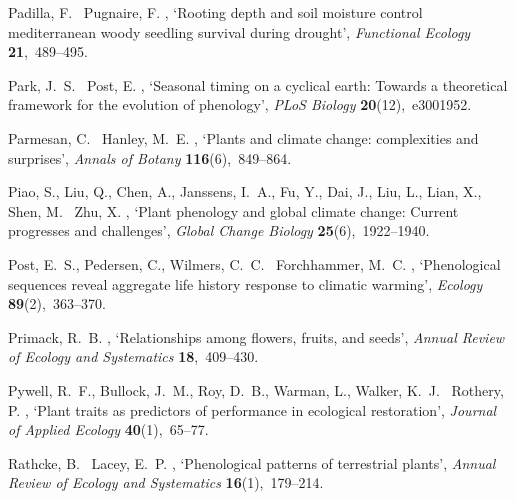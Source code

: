 \documentclass[11pt]{article}
\begin{document}
\begin{thebibliography}{xx}
Padilla, F. \harvardand\ Pugnaire, F.  \harvardyearright ,
  `Rooting depth and soil moisture control mediterranean woody seedling
  survival during drought', {\em Functional Ecology} {\bf 21},~489--495.

Park, J.~S. \harvardand\ Post, E.  \harvardyearright ,
  `Seasonal timing on a cyclical earth: Towards a theoretical framework for the
  evolution of phenology', {\em PLoS Biology} {\bf 20}(12),~e3001952.

Parmesan, C. \harvardand\ Hanley, M.~E.  \harvardyearright
  , `Plants and climate change: complexities and surprises', {\em Annals of
  Botany} {\bf 116}(6),~849--864.

Piao, S., Liu, Q., Chen, A., Janssens, I.~A., Fu, Y., Dai, J., Liu, L., Lian,
  X., Shen, M. \harvardand\ Zhu, X.  \harvardyearright ,
  `Plant phenology and global climate change: Current progresses and
  challenges', {\em Global Change Biology} {\bf 25}(6),~1922--1940.

Post, E.~S., Pedersen, C., Wilmers, C.~C. \harvardand\ Forchhammer, M.~C.
  \harvardyearleft 2008\harvardyearright , `Phenological sequences reveal
  aggregate life history response to climatic warming', {\em Ecology} {\bf
  89}(2),~363--370.

Primack, R.~B.  \harvardyearright , `Relationships among
  flowers, fruits, and seeds', {\em Annual Review of Ecology and Systematics}
  {\bf 18},~409--430.

Pywell, R.~F., Bullock, J.~M., Roy, D.~B., Warman, L., Walker, K.~J.
  \harvardand\ Rothery, P.  \harvardyearright , `Plant
  traits as predictors of performance in ecological restoration', {\em Journal
  of Applied Ecology} {\bf 40}(1),~65--77.

Rathcke, B. \harvardand\ Lacey, E.~P.  \harvardyearright ,
  `Phenological patterns of terrestrial plants', {\em Annual Review of Ecology
  and Systematics} {\bf 16}(1),~179--214.


\end{thebibliography}
\end{document}
